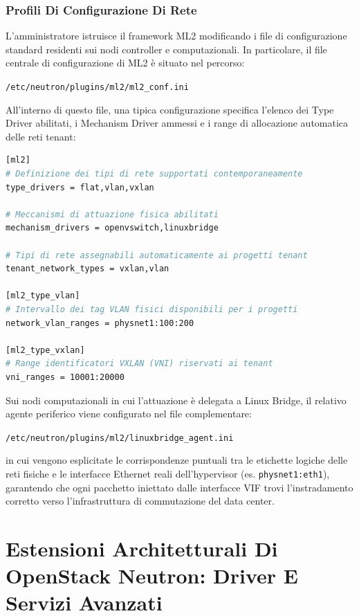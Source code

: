 \documentclass[11pt, a4paper]{article}
\begin{document}
\subsubsection{Profili Di Configurazione Di Rete}

L'amministratore istruisce il framework ML2 modificando i file di configurazione standard residenti sui nodi controller e computazionali. In particolare, il file centrale di configurazione di ML2 è situato nel percorso:
\begin{center}
    \texttt{/etc/neutron/plugins/ml2/ml2\_conf.ini}
\end{center}
All'interno di questo file, una tipica configurazione specifica l'elenco dei Type Driver abilitati, i Mechanism Driver ammessi e i range di allocazione automatica delle reti tenant:

\begin{lstlisting}[language=bash]
[ml2]
# Definizione dei tipi di rete supportati contemporaneamente
type_drivers = flat,vlan,vxlan

# Meccanismi di attuazione fisica abilitati
mechanism_drivers = openvswitch,linuxbridge

# Tipi di rete assegnabili automaticamente ai progetti tenant
tenant_network_types = vxlan,vlan

[ml2_type_vlan]
# Intervallo dei tag VLAN fisici disponibili per i progetti
network_vlan_ranges = physnet1:100:200

[ml2_type_vxlan]
# Range identificatori VXLAN (VNI) riservati ai tenant
vni_ranges = 10001:20000
\end{lstlisting}

Sui nodi computazionali in cui l'attuazione è delegata a Linux Bridge, il relativo agente periferico viene configurato nel file complementare:
\begin{center}
    \texttt{/etc/neutron/plugins/ml2/linuxbridge\_agent.ini}
\end{center}
in cui vengono esplicitate le corrispondenze puntuali tra le etichette logiche delle reti fisiche e le interfacce Ethernet reali dell'hypervisor (es. \texttt{physnet1:eth1}), garantendo che ogni pacchetto iniettato dalle interfacce VIF trovi l'instradamento corretto verso l'infrastruttura di commutazione del data center.


\section{Estensioni Architetturali Di OpenStack Neutron: Driver E Servizi Avanzati}
\end{document}

